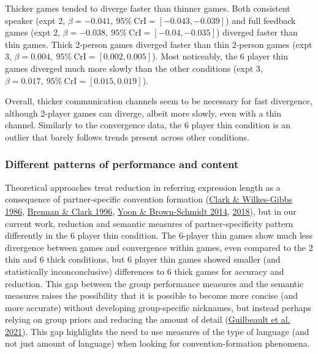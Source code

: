 \documentclass[
  english,
  a4paper,
]{article}
\begin{document}
Thicker games tended to diverge faster than thinner games. Both consistent speaker (expt 2, \(\beta=-0.041,\:95\%\:\mathrm{CrI}=[-0.043, -0.039]\)) and full feedback games (expt 2, \(\beta=-0.038,\:95\%\:\mathrm{CrI}=[-0.04, -0.035]\)) diverged faster than thin games. Thick 2-person games diverged faster than thin 2-person games (expt 3, \(\beta=0.004,\:95\%\:\mathrm{CrI}=[0.002, 0.005]\)). Most noticeably, the 6 player thin games diverged much more slowly than the other conditions (expt 3, \(\beta=0.017,\:95\%\:\mathrm{CrI}=[0.015, 0.019]\)).

Overall, thicker communication channels seem to be necessary for fast divergence, although 2-player games can diverge, albeit more slowly, even with a thin channel. Similarly to the convergence data, the 6 player thin condition is an outlier that barely follows trends present across other conditions.

\hypertarget{different-patterns-of-performance-and-content}{%
\subsubsection{Different patterns of performance and content}\label{different-patterns-of-performance-and-content}}

Theoretical approaches treat reduction in referring expression length as a consequence of partner-specific convention formation (\protect\hyperlink{ref-clark1986}{Clark \& Wilkes-Gibbs 1986}, \protect\hyperlink{ref-brennan1996}{Brennan \& Clark 1996}, \protect\hyperlink{ref-yoon2014}{Yoon \& Brown-Schmidt 2014}, \protect\hyperlink{ref-yoon2018}{2018}), but in our current work, reduction and semantic measures of partner-specificity pattern differently in the 6 player thin condition. The 6-player thin games show much less divergence between games and convergence within games, even compared to the 2 thin and 6 thick conditions, but 6 player thin games showed smaller (and statistically inconconclusive) differences to 6 thick games for accuracy and reduction. This gap between the group performance measures and the semantic measures raises the possibility that it is possible to become more concise (and more accurate) without developing group-specific nicknames, but instead perhaps relying on group priors and reducing the amount of detail (\protect\hyperlink{ref-guilbeault2021}{Guilbeault et al. 2021}). This gap highlights the need to use measures of the type of language (and not just amount of language) when looking for convention-formation phenomena.
\end{document}
